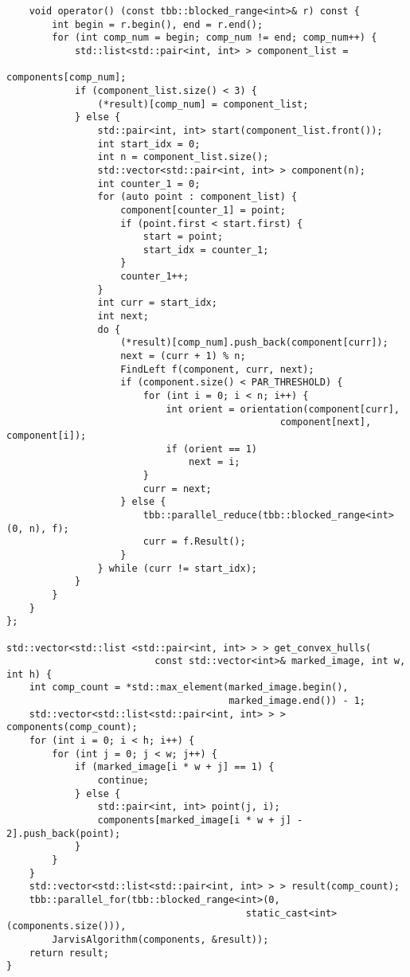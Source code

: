 \documentclass{report}
\begin{document}
\begin{lstlisting}
    void operator() (const tbb::blocked_range<int>& r) const {
        int begin = r.begin(), end = r.end();
        for (int comp_num = begin; comp_num != end; comp_num++) {
            std::list<std::pair<int, int> > component_list =
                                                          components[comp_num];
            if (component_list.size() < 3) {
                (*result)[comp_num] = component_list;
            } else {
                std::pair<int, int> start(component_list.front());
                int start_idx = 0;
                int n = component_list.size();
                std::vector<std::pair<int, int> > component(n);
                int counter_1 = 0;
                for (auto point : component_list) {
                    component[counter_1] = point;
                    if (point.first < start.first) {
                        start = point;
                        start_idx = counter_1;
                    }
                    counter_1++;
                }
                int curr = start_idx;
                int next;
                do {
                    (*result)[comp_num].push_back(component[curr]);
                    next = (curr + 1) % n;
                    FindLeft f(component, curr, next);
                    if (component.size() < PAR_THRESHOLD) {
                        for (int i = 0; i < n; i++) {
                            int orient = orientation(component[curr],
                                                component[next], component[i]);
                            if (orient == 1)
                                next = i;
                        }
                        curr = next;
                    } else {
                        tbb::parallel_reduce(tbb::blocked_range<int>(0, n), f);
                        curr = f.Result();
                    }
                } while (curr != start_idx);
            }
        }
    }
};

std::vector<std::list <std::pair<int, int> > > get_convex_hulls(
                          const std::vector<int>& marked_image, int w, int h) {
    int comp_count = *std::max_element(marked_image.begin(),
                                       marked_image.end()) - 1;
    std::vector<std::list<std::pair<int, int> > > components(comp_count);
    for (int i = 0; i < h; i++) {
        for (int j = 0; j < w; j++) {
            if (marked_image[i * w + j] == 1) {
                continue;
            } else {
                std::pair<int, int> point(j, i);
                components[marked_image[i * w + j] - 2].push_back(point);
            }
        }
    }
    std::vector<std::list<std::pair<int, int> > > result(comp_count);
    tbb::parallel_for(tbb::blocked_range<int>(0,
                                          static_cast<int>(components.size())),
        JarvisAlgorithm(components, &result));
    return result;
}


\end{lstlisting}
\end{document}
